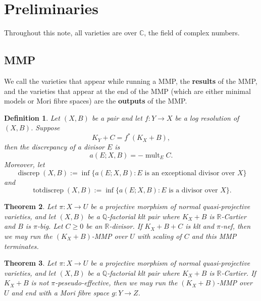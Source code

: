 \documentclass[11pt]{amsart}
\newtheorem{defn}{Definition}[section]
\newtheorem{thm}[defn]{Theorem}
\begin{document}
\section{Preliminaries}
Throughout this note, all varieties are over $\mathbb{C}$, the field of complex numbers.
\subsection{MMP}
We call the varieties that appear while running a MMP, the \textbf{results} of the MMP, and the varieties that appear at the end of the MMP (which are either minimal models or Mori fibre spaces) are the \textbf{outputs}  of the MMP. 
\begin{defn}
  Let $(X,B)$ be a pair  and let  $f:Y\to X$ be a log resolution of $(X,B)$. Suppose
  \[
  K_{Y}+C=f^*(K_{X}+B)
  ,\]
then the discrepancy  of a divisor $E$ is
\[
  a(E;X,B)=-\operatorname{mult}_{E}C
.\]
 Moreover, let
\[
  \operatorname{discrep}(X, B) := \operatorname{inf}\{a(E; X, B) : E \text{ is an exceptional divisor over } X \}
\]
and
\[
  \operatorname{totdiscrep}(X, B) :=\operatorname{inf}\{a(E; X, B) : E \text{ is a divisor over } X\}.
\]
\end{defn}

\begin{thm}
\cite[Corollary 1.4.2]{BCHM10} Let $ \pi:X\to U $ be a projective morphism of normal quasi-projective varieties, and let $(X,B)$ be a $\mathbb{Q}$-factorial klt pair where $K_{X}+B$ is $\mathbb{R}$-Cartier and $B$ is $\pi$-big. Let $C\geqslant0$ be an $\mathbb{R}$-divisor. If $K_{X}+B+C$ is klt and  $\pi$-nef, then we may run the $(K_{X}+B)$-MMP over $U$  with scaling of $C$ and this MMP terminates.
\end{thm}

\begin{thm}\label{notpseudoeffmfs}
  \cite[Corollary 1.3.3]{BCHM10} Let $ \pi:X\to U $ be a projective morphism of normal quasi-projective varieties, and let $(X,B)$ be a $\mathbb{Q}$-factorial klt pair where $K_{X}+B$ is $\mathbb{R}$-Cartier.  If $K_{X}+B$ is  not $\pi$-peseudo-effective, then we may run the $(K_{X}+B)$-MMP over  $U$  and end with a Mori fibre space $g:Y\to Z$.
\end{thm}
\end{document}
